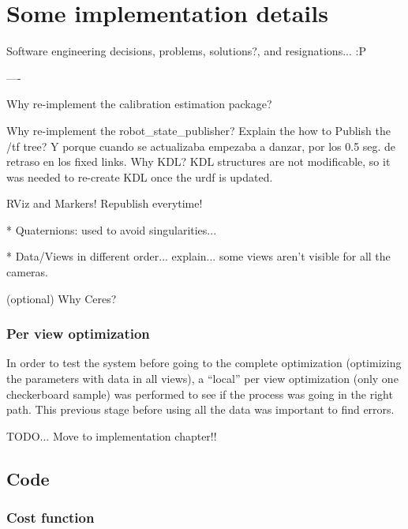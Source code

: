 \chapter{Some implementation details}
\label{cha:implementation}

Software engineering decisions, problems, solutions?, and resignations... :P


----

Why re-implement the calibration estimation package?

Why re-implement the robot\_state\_publisher? Explain the how to Publish the /tf tree?
Y porque cuando se actualizaba empezaba a danzar, por los 0.5 seg. de retraso en los fixed links.
Why KDL? KDL structures are not modificable, so it was needed to re-create KDL once the urdf is updated.

RViz and Markers! Republish everytime!

* Quaternions: used to avoid singularities...

* Data/Views in different order... explain... some views aren't visible for all the cameras.

(optional)
Why Ceres?




\subsection{Per view optimization}

In order to test the system before going to the complete optimization (optimizing the parameters with data in all views), a ``local'' per view optimization (only one checkerboard sample) was performed to see if the process was going in the right path. This previous stage before using all the data was important to find errors.

TODO... Move to implementation chapter!!


\section{Code}
\subsection{Cost function}
\label{sec:ceres_impl}



